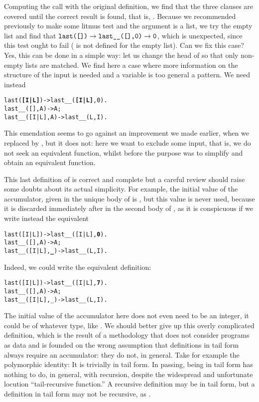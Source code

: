 Computing the call  with the original
definition, we find that the three clauses are covered until the
correct result is found, that is, . Because we recommended
previously to make some litmus test and the argument is a list, we try
the empty list and find that \(\texttt{last([])} \rightarrow
\texttt{last\_\_([],0)} \rightarrow \texttt{0}\), which is
unexpected, since this test ought to fail ( is not
defined for the empty list). Can we fix this case? Yes, this can be
done in a simple way: let us change the head of  so
that only non\hyp{}empty lists are matched. We find here a case where
more information on the structure of the input is needed and a
variable is too general a pattern. We need instead
\begin{alltt}
last(\textbf{[I|L]})     -> last__(\textbf{[I|L]},0).\hfill% \emph{Fixed}
last__(   [],A) -> A;
last__([I|L],A) -> last__(L,I).
\end{alltt}
This emendation seems to go against an improvement we made earlier,
when we replaced \erlcode{[J|L]} by , but it does not: here
we want to exclude some input, that is, we do not seek an equivalent
function, whilst before the purpose was to simplify and obtain an
equivalent function.

This last definition of  is correct and complete but a
careful review should raise some doubts about its actual
simplicity. For example, the initial value of the accumulator, given
in the unique body of  is , but this value
is never used, because it is discarded immediately after in the second
body of , as it is conspicuous if we write instead
the equivalent
\begin{alltt}
last([I|L])     -> last__([I|L],\textbf{0}).\hfill% \emph{Why zero?}
last__(   [],A) -> A;
last__([I|L],\textbf{\_}) -> last__(L,I).\hfill% A \emph{was useless}
\end{alltt}
Indeed, we could write the equivalent definition:
\begin{alltt}
last([I|L])     -> last__([I|L],\textbf{7}).\hfill% \emph{Why not 7?}
last__(   [],A) -> A;
last__([I|L],_) -> last__(L,I).
\end{alltt}
The initial value of the accumulator here does not even need to be an
integer, it could be of whatever type, like \erlcode{[4,[]]}. We
should better give up this overly complicated definition, which is the
result of a methodology that does not consider programs as data and is
founded on the wrong assumption that definitions in tail form always
require an accumulator: they do not, in general. Take for example the
polymorphic identity:  It is trivially in tail
form. In passing, being in tail form has nothing to do, in general,
with recursion, despite the widespread and unfortunate locution
``tail\hyp{}recursive function.'' A recursive definition may be in tail
form, but a definition in tail form may not be recursive, as
.

